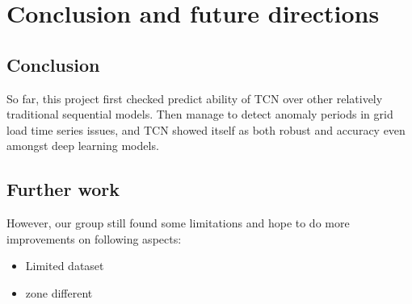
\chapter{Conclusion and future directions} %

\label{Chapter5} %


\section{Conclusion}
So far, this project first checked predict ability of TCN over other relatively traditional sequential models. Then manage to detect anomaly periods in grid load time series issues, and TCN showed itself as both robust and accuracy even amongst deep learning models.

\section{Further work}
However, our group still found some limitations and hope to do more improvements on following aspects:
\begin{itemize}
    \item Limited dataset
    \item zone different
\end{itemize}